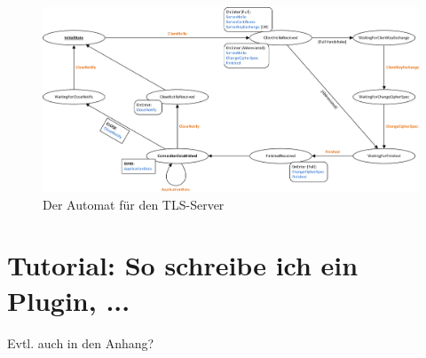 \begin{figure}[H]
	\centering
	\includegraphics[scale=0.75, angle = 90]{Diagrams/server_state_machine.png} %
	\caption{Der Automat für den TLS-Server}
	\label{fig_tls_server_state_machine}
\end{figure}

\section{Tutorial: So schreibe ich ein Plugin, ...}

Evtl. auch in den Anhang?